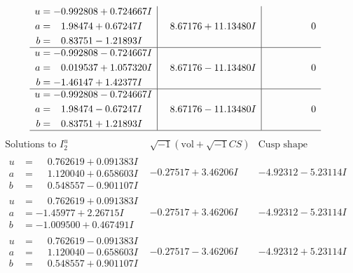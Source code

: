 \documentclass[1p]{elsarticle_modified}
\theoremstyle{definition}
\newcommand{\I}{\sqrt{-1}}
\begin{document}
$$\begin{array}{c|c|c}
\begin{aligned}
u &= -0.992808 + 0.724667 I \\
a &= \phantom{-}1.98474 + 0.67247 I \\
b &= \phantom{-}0.83751 - 1.21893 I\end{aligned}
 & \phantom{-}8.67176 + 11.13480 I & \phantom{-0.000000 } 0 \\ \hline\begin{aligned}
u &= -0.992808 - 0.724667 I \\
a &= \phantom{-}0.019537 + 1.057320 I \\
b &= -1.46147 + 1.42377 I\end{aligned}
 & \phantom{-}8.67176 - 11.13480 I & \phantom{-0.000000 } 0 \\ \hline\begin{aligned}
u &= -0.992808 - 0.724667 I \\
a &= \phantom{-}1.98474 - 0.67247 I \\
b &= \phantom{-}0.83751 + 1.21893 I\end{aligned}
 & \phantom{-}8.67176 - 11.13480 I & \phantom{-0.000000 } 0\\
 \hline 
 \end{array}$$\newpage$$\begin{array}{c|c|c}  
\text{Solutions to }I^u_{2}& \I (\text{vol} + \sqrt{-1}CS) & \text{Cusp shape}\\
 \hline 
\begin{aligned}
u &= \phantom{-}0.762619 + 0.091383 I \\
a &= \phantom{-}1.120040 + 0.658603 I \\
b &= \phantom{-}0.548557 - 0.901107 I\end{aligned}
 & -0.27517 + 3.46206 I & -4.92312 - 5.23114 I \\ \hline\begin{aligned}
u &= \phantom{-}0.762619 + 0.091383 I \\
a &= -1.45977 + 2.26715 I \\
b &= -1.009500 + 0.467491 I\end{aligned}
 & -0.27517 + 3.46206 I & -4.92312 - 5.23114 I \\ \hline\begin{aligned}
u &= \phantom{-}0.762619 - 0.091383 I \\
a &= \phantom{-}1.120040 - 0.658603 I \\
b &= \phantom{-}0.548557 + 0.901107 I\end{aligned}
 & -0.27517 - 3.46206 I & -4.92312 + 5.23114 I \\ \hline\begin{aligned}

\end{aligned}
\end{array}$$
\end{document}
